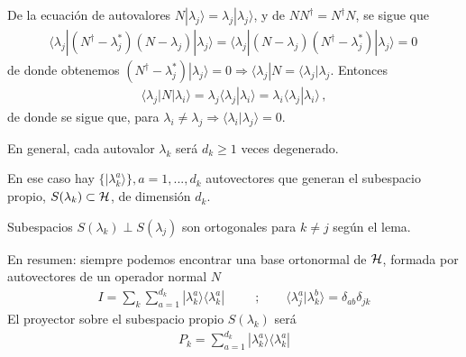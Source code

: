 \documentclass[letterpaper,10pt,english]{jupyterBook}
\newcommand{\bra}[1]{\langle #1|}
\newcommand{\ket}[1]{|#1\rangle}
\newcommand{\braket}[2]{\langle #1|#2\rangle}
\newcommand{\ketbra}[2]{| #1\rangle \langle #2 |}
\newcommand{\Hil}{{\cal H}}
\begin{document}
\sphinxAtStartPar
De la ecuación de autovalores \(N\ket{\lambda_j} =  \lambda_j \ket{\lambda_j}\), y de \(NN^\dagger = N^\dagger N\), se sigue que
\begin{equation*}
\begin{split}
\bra{\lambda_j}(N^\dagger - \lambda_j^*)(N - \lambda_j) \ket{\lambda_j} = \bra{\lambda_j}(N - \lambda_j)(N^\dagger - \lambda_j^*) \ket{\lambda_j}  = 0\,
\end{split}
\end{equation*}
\sphinxAtStartPar
de donde obtenemos \((N^\dagger - \lambda_j^*) \ket{\lambda_j} = 0 \Rightarrow \bra{\lambda_j} N = \bra{\lambda_j}\lambda_j\). Entonces
\begin{equation*}
\begin{split}
\bra{\lambda_j}N\ket{\lambda_i} = \lambda_j \braket{\lambda_j}{\lambda_i} = \lambda_i \braket{\lambda_j}{\lambda_i} \, ,
\end{split}
\end{equation*}
\sphinxAtStartPar
de donde se sigue que, para \(\lambda_i \neq \lambda_j \Rightarrow \braket{\lambda_i}{\lambda_j} = 0\).

\sphinxAtStartPar
En general, cada autovalor \(\lambda_k\) será \(d_k \geq 1\) veces degenerado.

\sphinxAtStartPar
En ese caso hay  \(\{\ket{\lambda^a_k}\}, a=1,...,d_k\) autovectores que generan el subespacio propio, \(S(\lambda_k)\subset \Hil \), de dimensión \(d_k\).

\sphinxAtStartPar
Subespacios \(S(\lambda_k)\perp S(\lambda_j)\) son ortogonales para \(k\neq j\) según el lema.

\sphinxAtStartPar
En resumen: siempre podemos encontrar una base  ortonormal de \(\Hil\), formada por autovectores de un operador normal \(N\)
\begin{equation*}
\begin{split}
I = \sum_k\sum_{a=1}^{d_k} \ket{\lambda^a_k}\bra{\lambda^a_k} ~~~~~~~~~~~;~~~~~~~~~ \braket{\lambda^a_j}{\lambda^b_k} = \delta_{ab}\delta_{jk}
\end{split}
\end{equation*}
\sphinxAtStartPar
El proyector sobre el subespacio propio \(S(\lambda_k)\) será
\begin{equation*}
\begin{split}
P_k = \sum_{a=1}^{d_k} \ketbra{\lambda^a_k}{\lambda^a_k}
\end{split}
\end{equation*}
\end{document}
